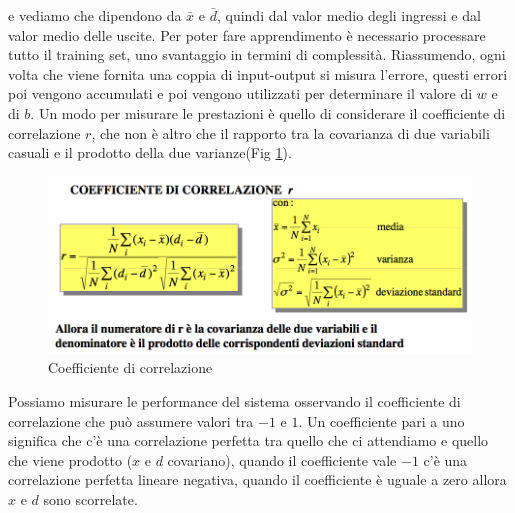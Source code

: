 e vediamo che dipendono da $\bar{x}$ e $\bar{d}$, quindi dal valor medio degli ingressi e dal valor medio delle uscite. Per poter fare apprendimento è necessario processare tutto il training set, uno svantaggio in termini di complessità. Riassumendo, ogni volta che viene fornita una coppia di input-output si misura l'errore, questi errori poi vengono accumulati e poi vengono utilizzati per determinare il valore di $w$ e di $b$. Un modo per misurare le prestazioni è quello di considerare il coefficiente di correlazione $r$, che non è altro che il rapporto tra la covarianza di due variabili casuali e il prodotto della due varianze(Fig \ref{coeff}). 
\begin{figure}[h]
\centering
\includegraphics[scale=0.5]{img/coeff.png}
\caption{Coefficiente di correlazione}
\label{coeff}
\end{figure}
Possiamo misurare le performance del sistema osservando il coefficiente di correlazione che può assumere valori tra $-1$ e $1$. Un coefficiente pari a uno significa che c'è una correlazione perfetta tra quello che ci attendiamo e quello che viene prodotto ($x$ e $d$ covariano), quando il coefficiente vale $-1$ c'è una correlazione perfetta lineare negativa, quando il coefficiente è uguale a zero allora $x$ e $d$ sono scorrelate.

